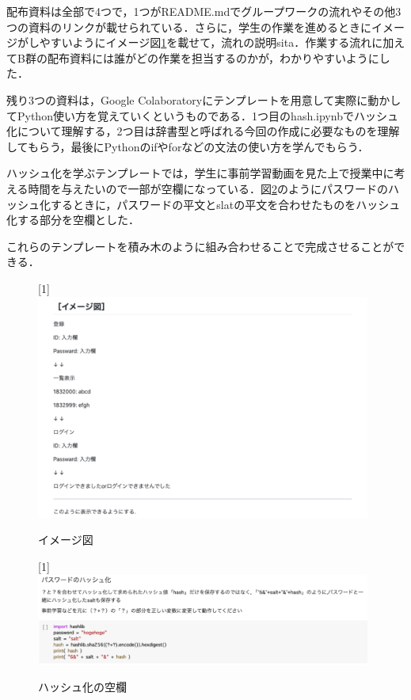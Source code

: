 \documentclass[a4j,11pt]{jsarticle}
\begin{document}
配布資料は全部で4つで，1つがREADME.mdでグループワークの流れやその他3つの資料のリンクが載せられている．さらに，学生の作業を進めるときにイメージがしやすいようにイメージ図\ref{kadai2}を載せて，流れの説明sita．作業する流れに加えてB群の配布資料には誰がどの作業を担当するのかが，わかりやすいようにした．

残り3つの資料は，Google Colaboratoryにテンプレートを用意して実際に動かしてPython使い方を覚えていくというものである．1つ目のhash.ipynbでハッシュ化について理解する，2つ目は辞書型と呼ばれる今回の作成に必要なものを理解してもらう，最後にPythonのifやforなどの文法の使い方を学んでもらう．

ハッシュ化を学ぶテンプレートでは，学生に事前学習動画を見た上で授業中に考える時間を与えたいので一部が空欄になっている．図\ref{kadai3}のようにパスワードのハッシュ化するときに，パスワードの平文とslatの平文を合わせたものをハッシュ化する部分を空欄とした．

これらのテンプレートを積み木のように組み合わせることで完成させることができる．



\begin{figure}[h]
\begin{center}
\scalebox{1}[1]{
 \includegraphics[clip,width=110mm]{kadai2.pdf}
 }
\end{center}
 \caption{イメージ図}
 \label{kadai2}
\end{figure}

\newpage

\begin{figure}[h]
\begin{center}
\scalebox{1}[1]{
 \includegraphics[clip,width=110mm]{kadai3.pdf}
 }
\end{center}
 \caption{ハッシュ化の空欄}
 \label{kadai3}
\end{figure}
\end{document}
